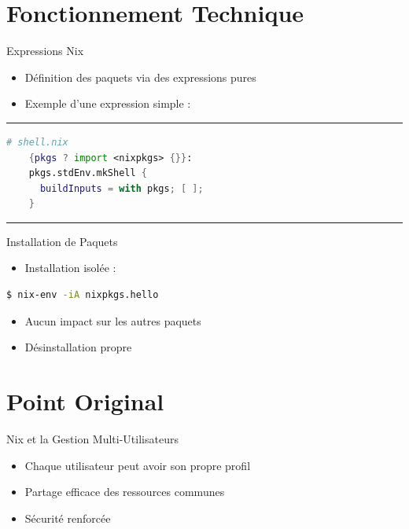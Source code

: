 \documentclass{beamer}
\begin{document}
\section{Fonctionnement Technique}

\begin{frame}[fragile]{Expressions Nix}
	\begin{itemize}
		\item Définition des paquets via des expressions pures
		\item Exemple d'une expression simple :
	\end{itemize}
	\rule{\linewidth}{0.4pt}

	\begin{lstlisting}[language=nix]
    # shell.nix
    {pkgs ? import <nixpkgs> {}}:
    pkgs.stdEnv.mkShell {
      buildInputs = with pkgs; [ ];
    }
  \end{lstlisting}
	\rule{\linewidth}{0.4pt}
\end{frame}

\begin{frame}[fragile]{Installation de Paquets}
	\begin{itemize}
		\item Installation isolée :
	\end{itemize}
	\begin{lstlisting}[language=bash]
$ nix-env -iA nixpkgs.hello
    \end{lstlisting}
	\begin{itemize}
		\item Aucun impact sur les autres paquets
		\item Désinstallation propre
	\end{itemize}
\end{frame}

\section{Point Original}

\begin{frame}{Nix et la Gestion Multi-Utilisateurs}
	\begin{itemize}
		\item Chaque utilisateur peut avoir son propre profil
		\item Partage efficace des ressources communes
		\item Sécurité renforcée
	\end{itemize}
\end{frame}
\end{document}
